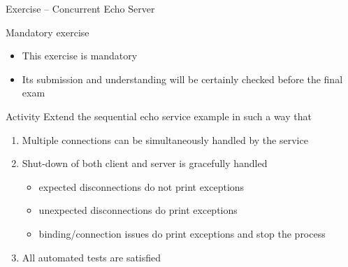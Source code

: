 \documentclass{beamer}\mode<presentation>{\usetheme{AMSBolognaFC}}
\begin{document}
\startExercise

\begin{frame}[c,allowframebreaks]{Exercise \currentExercise{} -- Concurrent Echo Server}

    \begin{alertblock}{Mandatory exercise}
        \begin{itemize}
            \item This exercise is mandatory
            \item Its submission and understanding will be certainly checked before the final exam
        \end{itemize}
    \end{alertblock}

    \begin{block}{Activity}
        Extend the sequential echo service example in such a way that
        \begin{enumerate}
            \item Multiple connections can be simultaneously handled by the service
            \item Shut-down of both client and server is gracefully handled
            \begin{itemize}
                \item expected disconnections do not print exceptions
                \item unexpected disconnections do print exceptions
                \item binding/connection issues do print exceptions and stop the process
            \end{itemize}

            \item All automated tests are satisfied
        \end{enumerate}
    \end{block}

\end{frame}


\section*{}

\frame{\titlepage}
\end{document}
